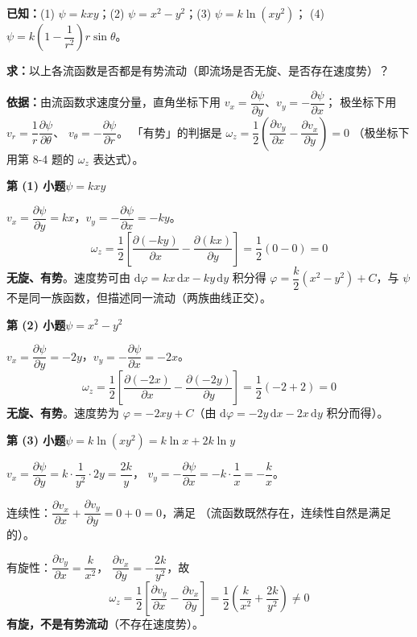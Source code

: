 \begin{jie}
\textbf{已知：}(1) $\psi=kxy$；(2) $\psi=x^2-y^2$；(3) $\psi=k\ln(xy^2)$；
(4) $\psi=k\left(1-\dfrac{1}{r^2}\right)r\sin\theta$。

\textbf{求：}以上各流函数是否都是有势流动（即流场是否无旋、是否存在速度势）？

\textbf{依据：}由流函数求速度分量，直角坐标下用
$v_x=\dfrac{\partial\psi}{\partial y}$、$v_y=-\dfrac{\partial\psi}{\partial x}$；
极坐标下用 $v_r=\dfrac{1}{r}\dfrac{\partial\psi}{\partial\theta}$、
$v_\theta=-\dfrac{\partial\psi}{\partial r}$。
「有势」的判据是 $\omega_z=\dfrac{1}{2}\left(\dfrac{\partial v_y}{\partial x}-\dfrac{\partial v_x}{\partial y}\right)=0$
（极坐标下用第 8-4 题的 $\omega_z$ 表达式）。

\textbf{第 (1) 小题\quad $\psi=kxy$}

$v_x=\dfrac{\partial\psi}{\partial y}=kx$，$v_y=-\dfrac{\partial\psi}{\partial x}=-ky$。
\[ \omega_z=\frac{1}{2}\left[\frac{\partial(-ky)}{\partial x}-\frac{\partial(kx)}{\partial y}\right]
 =\frac{1}{2}(0-0)=0 \]
\textbf{无旋、有势}。速度势可由
$\mathrm{d}\varphi=kx\,\mathrm{d}x-ky\,\mathrm{d}y$ 积分得
$\varphi=\dfrac{k}{2}\left(x^2-y^2\right)+C$，与 $\psi$ 不是同一族函数，但描述同一流动（两族曲线正交）。

\textbf{第 (2) 小题\quad $\psi=x^2-y^2$}

$v_x=\dfrac{\partial\psi}{\partial y}=-2y$，$v_y=-\dfrac{\partial\psi}{\partial x}=-2x$。
\[ \omega_z=\frac{1}{2}\left[\frac{\partial(-2x)}{\partial x}-\frac{\partial(-2y)}{\partial y}\right]
 =\frac{1}{2}(-2+2)=0 \]
\textbf{无旋、有势}。速度势为
$\varphi=-2xy+C$（由 $\mathrm{d}\varphi=-2y\,\mathrm{d}x-2x\,\mathrm{d}y$ 积分而得）。

\textbf{第 (3) 小题\quad $\psi=k\ln(xy^2)=k\ln x+2k\ln y$}

$v_x=\dfrac{\partial\psi}{\partial y}=k\cdot\dfrac{1}{y^2}\cdot 2y=\dfrac{2k}{y}$，
$v_y=-\dfrac{\partial\psi}{\partial x}=-k\cdot\dfrac{1}{x}=-\dfrac{k}{x}$。

连续性：$\dfrac{\partial v_x}{\partial x}+\dfrac{\partial v_y}{\partial y}=0+0=0$，满足
（流函数既然存在，连续性自然是满足的）。

有旋性：$\dfrac{\partial v_y}{\partial x}=\dfrac{k}{x^2}$，
$\dfrac{\partial v_x}{\partial y}=-\dfrac{2k}{y^2}$，故
\[ \omega_z=\frac{1}{2}\left[\frac{\partial v_y}{\partial x}-\frac{\partial v_x}{\partial y}\right]
 =\frac{1}{2}\left(\frac{k}{x^2}+\frac{2k}{y^2}\right)\neq0 \]
\textbf{有旋，不是有势流动}（不存在速度势）。


\end{jie}
